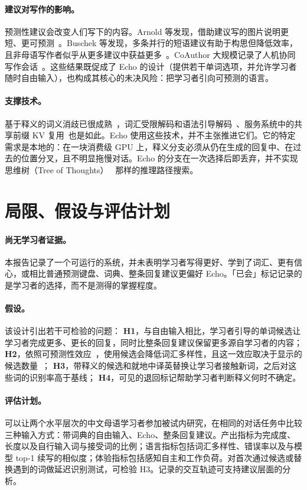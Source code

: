 \documentclass[11pt,a4paper,fontset=windows]{ctexart}
\begin{document}
\paragraph{建议对写作的影响。}预测性建议会改变人们写下的内容。Arnold 等发现，借助建议写的图片说明更短、更可预测~\cite{predictable}。Buschek 等发现，多条并行的短语建议有助于构思但降低效率，且非母语写作者似乎从更多建议中获益更多~\cite{parallel}。CoAuthor 大规模记录了人机协同写作会话~\cite{coauthor}。这些结果既促成了 Echo 的设计（提供若干单词选项，并允许学习者随时自由输入），也构成其核心的未决风险：把学习者引向可预测的语言。

\paragraph{支撑技术。}基于释义的词义消歧已很成熟~\cite{glossbert}，词汇受限解码和语法引导解码~\cite{hokamp,outlines}、服务系统中的共享前缀 KV 复用~\cite{vllm,sglang,hydragen}也是如此。Echo 使用这些技术，并不主张推进它们。它的特定需求是本地的：在一块消费级 GPU 上，释义分支必须从仍在生成的回复中、在过去的位置分叉，且不明显拖慢对话。Echo 的分支在一次选择后即丢弃，并不实现思维树（Tree of Thoughts）~\cite{tot} 那样的推理路径搜索。

\section{局限、假设与评估计划}
\label{sec:limitations}
\paragraph{尚无学习者证据。}本报告记录了一个可运行的系统，并未表明学习者写得更好、学到了词汇、更有信心，或相比普通预测键盘、词典、整条回复建议更偏好 Echo。「已会」标记记录的是学习者的选择，而不是测得的掌握程度。

\paragraph{假设。}该设计引出若干可检验的问题：
\textbf{H1}，与自由输入相比，学习者引导的单词候选让学习者完成更多、更长的回复，同时比整条回复建议保留更多源自学习者的内容；
\textbf{H2}，依照可预测性效应~\cite{predictable}，使用候选会降低词汇多样性，且这一效应取决于显示的候选数量~\cite{parallel}；
\textbf{H3}，带释义的候选和就地中译英替换让学习者接触新词，之后对这些词的识别率高于基线；
\textbf{H4}，可见的退回标记帮助学习者判断释义何时不确定。

\paragraph{评估计划。}可以让两个水平层次的中文母语学习者参加被试内研究，在相同的对话任务中比较三种输入方式：带词典的自由输入、Echo、整条回复建议。产出指标为完成度、长度以及自行输入词与接受词的比例；语言指标包括词汇多样性、错误率以及与模型 top-1 续写的相似度；体验指标包括感知自主和工作负荷。对首次通过候选或替换遇到的词做延迟识别测试，可检验 H3。记录的交互轨迹可支持建议层面的分析。
\end{document}
